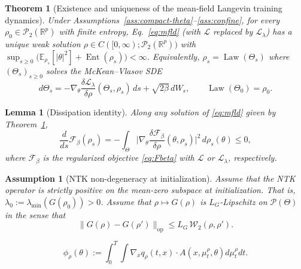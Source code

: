 \documentclass[10pt,a4paper]{amsart}
\newtheorem{assumption}{Assumption}
\newtheorem{theorem}{Theorem}
\newtheorem{lemma}{Lemma}
\DeclareMathOperator{\Ent}{Ent}
\DeclareMathOperator{\Law}{Law}
\newcommand{\Prob}{\mathcal{P}}
\newcommand{\R}{\mathbb{R}}
\newcommand{\Wass}{\mathcal{W}}
\begin{document}
\begin{theorem}[Existence and uniqueness of the mean-field Langevin training dynamics]
\label{thm:mfld-wp}
Under Assumptions~\ref{ass:compact-theta}--\ref{ass:confine}, for every $\rho_0\in\Prob_2(\R^p)$ with finite entropy, Eq.~\eqref{eq:mfld} (with $\mathcal L$ replaced by $\mathcal L_\lambda$) has a unique weak solution $\rho\in C([0,\infty);\Prob_2(\R^p))$ with $\sup_{s\ge0}\big(\mathbb E_{\rho_s}[|\theta|^2] + \Ent(\rho_s)\big)<\infty$. Equivalently, $\rho_s=\Law(\Theta_s)$ where $(\Theta_s)_{s\ge0}$ solves the McKean--Vlasov SDE
\begin{equation}
d\Theta_s = -\nabla_\theta\frac{\delta\mathcal L_\lambda}{\delta\rho}(\Theta_s,\rho_s)\,ds + \sqrt{2\beta}\,dW_s, \qquad \Law(\Theta_0)=\rho_0.
\label{eq:mfld-sde}
\end{equation}
\end{theorem}

\begin{lemma}[Dissipation identity]
\label{lem:dissipation}
Along any solution of \eqref{eq:mfld} given by Theorem~\ref{thm:mfld-wp},
\begin{equation}
\frac{d}{ds}\mathcal F_\beta(\rho_s) = -\int_\Theta \Big|\nabla_\theta\frac{\delta\mathcal F_\beta}{\delta\rho}(\theta,\rho_s)\Big|^2\,d\rho_s(\theta) \le 0,
\label{eq:dissipation}
\end{equation}
where $\mathcal F_\beta$ is the regularized objective \eqref{eq:Fbeta}  with $\mathcal L$ or  $\mathcal L_\lambda$, respectively.
\end{lemma}

\begin{assumption}[NTK non-degeneracy at initialization]
\label{ass:ntk}
Assume that the NTK operator is strictly positive on the mean-zero subspace at initialization. That is, $\lambda_0 := \lambda_{\min}(G(\rho_0)) > 0$. 
 Assume that $\rho\mapsto G(\rho)$ is $L_G$-Lipschitz on $\Prob(\Theta)$ in the sense that 
 $$
 \|G(\rho)-G(\rho')\|_{\mathrm{op}}\le L_G\,\Wass_2(\rho,\rho').
 $$
\end{assumption}

\begin{equation}\label{phir} 
\phi_\rho(\theta) := \int_0^T \int \nabla_x q_\rho(t, x)\cdot A(x, \mu_t^\rho, \theta)d\mu_t^\rho dt.
\end{equation} 
\end{document}
